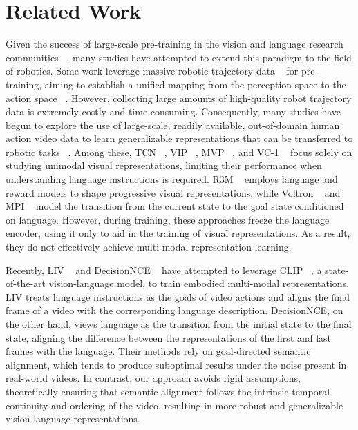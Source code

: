 \section{Related Work}
Given the success of large-scale pre-training in the vision  and language research communities ~\cite{nips20-gpt3,nips23-llava}, many studies have attempted to extend this paradigm to the field of robotics. Some work leverage massive robotic trajectory data ~\cite{corr23-rtx} for pre-training, aiming to establish a unified mapping from the perception space to the action space ~\cite{corl23-rt2,corr24-gr2}.  However, collecting large amounts of high-quality robot trajectory data is extremely costly and time-consuming. Consequently, many studies have begun to explore the use of large-scale, readily available, out-of-domain human action video data to learn generalizable representations that can be transferred to robotic tasks ~\cite{icra18-tcn,iclr23-vip,corl22-mvp,corl22-r3m,rss23-voltron,icml23-liv,nips23-vc1,DBLP:journals/corr/abs-2410-11758,rss24-mpi,icml24-decisionnce}. Among these, TCN ~\cite{icra18-tcn}, VIP ~\cite{iclr23-vip}, MVP ~\cite{corl22-mvp}, and VC-1 ~\cite{nips23-vc1} focus solely on studying unimodal visual representations, limiting their performance when understanding language instructions is required. R3M ~\cite{corl22-r3m} employs language and reward models to shape progressive visual representations, while Voltron ~\cite{rss23-voltron} and MPI ~\cite{rss24-mpi} model the transition from the current state to the goal state conditioned on language. However, during training, these approaches freeze the language encoder, using it only to aid in the training of visual representations. As a result, they do not effectively achieve multi-modal representation learning.

Recently, LIV ~\cite{icml23-liv} and DecisionNCE ~\cite{icml24-decisionnce} have attempted to leverage CLIP ~\cite{icml21-clip}, a state-of-the-art vision-language model, to train embodied multi-modal representations. LIV treats language instructions as the goals of video actions and aligns the final frame of a video with the corresponding language description. DecisionNCE, on the other hand, views language as the transition from the initial state to the final state, aligning the difference between the representations of the first and last frames with the language. Their methods rely on goal-directed semantic alignment, which tends to produce suboptimal results under the noise present in real-world videos. In contrast, our approach avoids rigid assumptions, theoretically ensuring that semantic alignment follows the intrinsic temporal continuity and ordering of the video, resulting in more robust and generalizable vision-language representations. 

